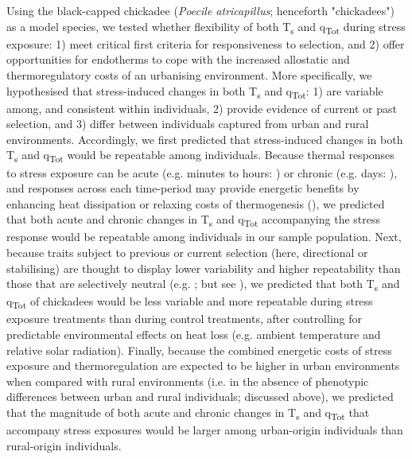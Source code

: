 \documentclass[12pt]{article}
\begin{document}
\noindent Using the black-capped chickadee (\textit{Poecile atricapillus}; henceforth "chickadees") as a model species, we tested whether flexibility of both T\textsubscript{s} and q\textsubscript{Tot} during stress exposure: 1) meet critical first criteria for responsiveness to selection, and 2) offer opportunities for endotherms to cope with the increased allostatic and thermoregulatory costs of an urbanising environment. More specifically, we hypothesised that stress-induced changes in both T\textsubscript{s} and q\textsubscript{Tot}: 1) are variable among, and consistent within individuals, 2) provide evidence of current or past selection, and 3) differ between individuals captured from urban and rural environments. Accordingly, we first predicted that stress-induced changes in both T\textsubscript{s} and q\textsubscript{Tot} would be repeatable among individuals. Because thermal responses to stress exposure can be acute (e.g. minutes to hours: \citealt{jerem_2015,andreasson_2020b,winder_2020}) or chronic (e.g. days: \citealt{bittencourt_2015,herborn_2018}), and responses across each time-period may provide energetic benefits by enhancing heat dissipation or relaxing costs of thermogenesis (\citealt{jerem_2018,herborn_2018,winder_2020,robertson_2020a}), we predicted that both acute and chronic changes in T\textsubscript{s} and q\textsubscript{Tot} accompanying the stress response would be repeatable among individuals in our sample population. Next, because traits subject to previous or current selection (here, directional or stabilising) are thought to display lower variability and higher repeatability than those that are selectively neutral (e.g. \citealt{gibson_1974,lande_1983,boake_1989,vanhomrigh_2007}; but see \citealt{kotiaho_2001}), we predicted that both T\textsubscript{s} and q\textsubscript{Tot} of chickadees would be less variable and more repeatable during stress exposure treatments than during control treatments, after controlling for predictable environmental effects on heat loss (e.g. ambient temperature and relative solar radiation). Finally, because the combined energetic costs of stress exposure and thermoregulation are expected to be higher in urban environments when compared with rural environments (i.e. in the absence of phenotypic differences between urban and rural individuals; discussed above), we predicted that the magnitude of both acute and chronic changes in T\textsubscript{s} and q\textsubscript{Tot} that accompany stress exposures would be larger among urban-origin individuals than rural-origin individuals. \vspace{1cm}
\end{document}

